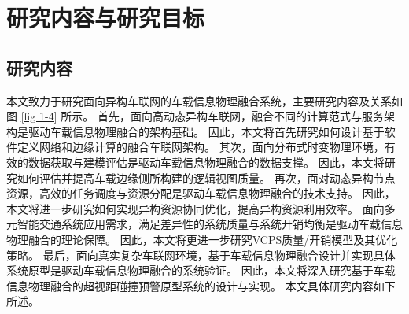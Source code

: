 %
%
%

\section{研究内容与研究目标}\label{section 1-4}

\subsection{研究内容}

本文致力于研究面向异构车联网的车载信息物理融合系统，主要研究内容及关系如图 \ref{fig 1-4} 所示。
首先，面向高动态异构车联网，融合不同的计算范式与服务架构是驱动车载信息物理融合的架构基础。
因此，本文将首先研究如何设计基于软件定义网络和边缘计算的融合车联网架构。
其次，面向分布式时变物理环境，有效的数据获取与建模评估是驱动车载信息物理融合的数据支撑。
因此，本文将研究如何评估并提高车载边缘侧所构建的逻辑视图质量。
再次，面对动态异构节点资源，高效的任务调度与资源分配是驱动车载信息物理融合的技术支持。
因此，本文将进一步研究如何实现异构资源协同优化，提高异构资源利用效率。
面向多元智能交通系统应用需求，满足差异性的系统质量与系统开销均衡是驱动车载信息物理融合的理论保障。
因此，本文将更进一步研究VCPS质量/开销模型及其优化策略。
最后，面向真实复杂车联网环境，基于车载信息物理融合设计并实现具体系统原型是驱动车载信息物理融合的系统验证。
因此，本文将深入研究基于车载信息物理融合的超视距碰撞预警原型系统的设计与实现。
本文具体研究内容如下所述。

